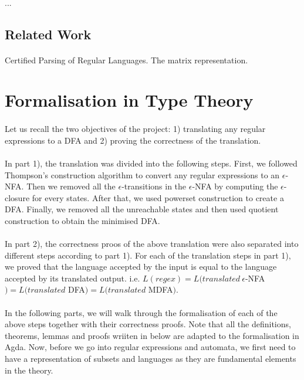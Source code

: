 \documentclass[twoside,openright,final]{bhamthesis}
\begin{document}
\paragraph{} ...

\subsection{Related Work}
\paragraph{} Certified Parsing of Regular Languages. The matrix
representation. 


\newpage
\section{Formalisation in Type Theory}
\paragraph{} Let us recall the two objectives of the project: 1) translating any
regular expressions to a DFA and 2) proving the correctness of the
translation. 

\paragraph{} In part 1), the translation was divided into the following steps. First, we
followed Thompson's construction algorithm to convert any regular expressions to an
\(\epsilon\)-NFA. Then we removed all the \(\epsilon\)-transitions in
the \(\epsilon\)-NFA by computing the \(\epsilon\)-closure for every states. After that, we used powerset
construction to create a DFA. Finally, we removed all the unreachable
states and then used quotient construction to obtain the minimised
DFA. 

\paragraph{} In part 2), the correctness proos of the above
translation were also separated into different steps according to part
1). For each of the translation steps in part 1), we proved
that the language accepted by the input is equal to the language
accepted by its translated output. i.e. \(L(regex) =
L(translated\ \epsilon\)-NFA\() = L(translated\) DFA\() =
L(translated\) MDFA\()\). 

\paragraph{} In the following parts, we will walk through the formalisation of
each of the above steps together with their correctness proofs. Note
that all the definitions, theorems, lemmas and proofs wriiten in below
are adapted to the formalisation in Agda. Now, before we go into
regular expressions and automata, we first need to have a
representation of subsets and languages as they are fundamental
elements in the theory. 
\end{document}
